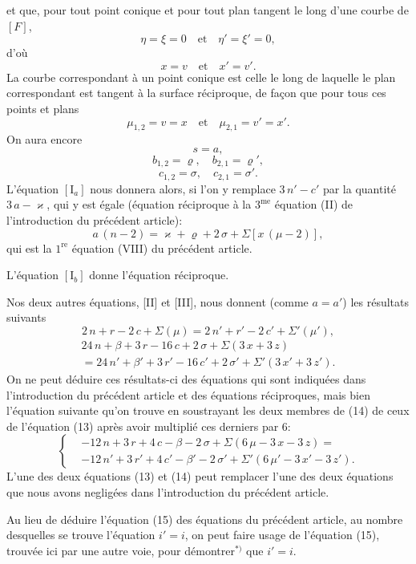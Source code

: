 \documentclass{article}
\begin{document}
et que, pour tout point conique et pour tout plan tangent le long d'une courbe de $[F]$,
\[
\eta = \xi = 0 \quad\text{et}\quad \eta' = \xi' = 0,
\]
d'où
\[
x = v \quad\text{et}\quad x' = v'.
\]
La courbe correspondant à un point conique est celle le long de laquelle le plan correspondant est tangent à la surface réciproque, de façon que pour tous ces points et plans
\[
\mu_{1, 2} = v = x \quad\text{et}\quad \mu_{2, 1} = v' = x'.
\]
On aura encore
\[
s = a,
\]
\[
b_{1, 2} = \varrho, \quad b_{2, 1} = \varrho',
\]
\[
c_{1, 2} = \sigma, \quad c_{2, 1} = \sigma'.
\]
L'équation $[\mathrm{I}_a]$ nous donnera alors, si l'on y remplace $3\,n' - c'$ par la quantité $3\,a - \varkappa$, qui y est égale (équation réciproque à la $3^{\text{me}}$ équation (II) de l'introduction du précédent article):
\[
a\,(n - 2) = \varkappa + \varrho + 2\,\sigma + \Sigma[x\,(\mu - 2)],
\]
qui est la $1^{\text{re}}$ équation (VIII) du précédent article.

L'équation $[\mathrm{I}_b]$ donne l'équation réciproque.

Nos deux autres équations, [II] et [III], nous donnent (comme $a = a'$) les résultats suivants
\[
2\,n + r - 2\,c + \Sigma(\mu) = 2\,n' + r' - 2\,c' + \Sigma'(\mu'), \tag{13}
\]
\[
\begin{aligned}
24\,n + \beta + 3\,r - 16\,c + 2\,\sigma + \Sigma(3\,x + 3\,z) \\
= 24\,n' + \beta' + 3\,r' - 16\,c' + 2\,\sigma' + \Sigma'(3\,x' + 3\,z').
\end{aligned} \tag{14}
\]
On ne peut déduire ces résultats-ci des équations qui sont indiquées dans l'introduction du précédent article et des équations réciproques, mais bien l'équation suivante qu'on trouve en soustrayant les deux membres de (14) de ceux de l'équation (13) après avoir multiplié ces derniers par $6$:
\[
\left\{
\begin{aligned}
& - 12\,n + 3\,r + 4\,c - \beta - 2\,\sigma + \Sigma(6\,\mu - 3\,x - 3\,z) = \\
& - 12\,n' + 3\,r' + 4\,c' - \beta' - 2\,\sigma' + \Sigma'(6\,\mu' - 3\,x' - 3\,z').
\end{aligned}
\right. \tag{15}
\]
L'une des deux équations (13) et (14) peut remplacer l'une des deux équations que nous avons negligées dans l'introduction du précédent article.

Au lieu de déduire l'équation (15) des équations du précédent article, au nombre desquelles se trouve l'équation $i' = i$, on peut faire usage de l'équation (15), trouvée ici par une autre voie, pour démontrer${}^{*)}$ que $i' = i$.
\end{document}
